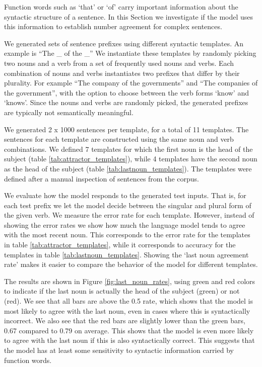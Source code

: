 Function words such as `that' or `of' carry 
important information about the syntactic structure of a sentence.
In this Section we investigate if the model
uses this information to establish number agreement
for complex sentences.

We generated sets of sentence prefixes using 
different syntactic templates.
An example is ``The \_ of the \_''
We instantiate these templates by randomly
picking two nouns and a verb 
from a set of frequently used nouns and verbs. 
Each combination of nouns and verbs instantiates
two prefixes that differ by their plurality.
For example ``The company of the governments''
and ``The companies of the government'',
with the option to choose between the verb forms
`know' and `knows'.
Since the nouns and verbs are randomly picked,
the generated prefixes 
are typically not semantically
meaningful.

We generated 2 x 1000 sentences per template,
for a total of 11 templates.
The sentences for each template are constructed using the same
noun and verb combinations.
We defined 7 templates for which the first noun is 
the head of the subject (table \ref{tab:attractor_templates}),
while 4 templates have the second noun as the head of the subject
(table \ref{tab:lastnoun_templates}).
The templates were defined after a manual inspection
of sentences from the corpus.

We evaluate how the model responds to the generated test inputs.
That is, for each test prefix we let the model decide between 
the singular and plural form of the given verb. 
We measure the error rate for each template.
However, instead of showing the error rates we
show how much the language model tends to agree with the most recent noun.
This corresponds to the error rate for the templates in table \ref{tab:attractor_templates},
while it corresponds to accuracy for the templates in table \ref{tab:lastnoun_templates}.
Showing the `last noun agreement rate' makes it easier
to compare the behavior of the model for different templates.

The results are shown in Figure \ref{fig:last_noun_rates},
using green and red colors to indicate if 
the last noun is actually the head of the subject (green)
or not (red). 
%
We see that all bars are above the 0.5 rate,
which shows that the model is most
likely to agree with the last noun,
even in cases where this is syntactically incorrect. 
%
We also see that the red bars are slightly
lower than the green bars,
0.67 compared to 0.79 on average.
This shows that the model is even more likely
to agree with the last noun if this is
also syntactically correct.
This suggests that the model has 
at least some sensitivity
to syntactic information carried by function words.
%

